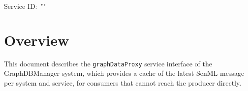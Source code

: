 \documentclass[a4paper]{arrowhead}
\begin{document}
\sloppy

\ArrowheadSetup

\begin{center}
  \vspace*{1cm}
  \huge{\arrowtitle}

  \vspace*{0.2cm}
  \LARGE{\arrowtype}
  \vspace*{1cm}

  \Large{Service ID: \textit{"\arrowid"}}

  \vspace*{\fill}


  \vspace*{1cm}
  \vspace*{\fill}

  \begin{abstract}
    This document describes the HTTP/1.1 protocol with TLS payload security and JSON payload encoding variant of the \texttt{graphDataProxy} service of the GraphDBManager system.
  \end{abstract}

  \vspace*{1cm}
\end{center}

\newpage

\tableofcontents
\newpage

\section{Overview}
\label{sec:overview}

This document describes the \texttt{graphDataProxy} service interface of the GraphDBManager system, which provides a cache of the latest SenML message per system and service, for consumers that cannot reach the producer directly.
\end{document}
